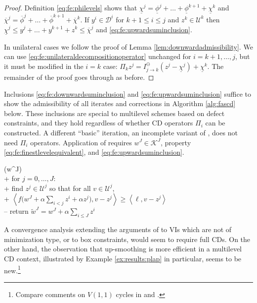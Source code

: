 \documentclass[review,hidelinks,onefignum,onetabnum]{siamart220329}
\newcommand{\ip}[2]{\left<#1,#2\right>}
\begin{document}
\begin{proof}  Definition \eqref{eq:fe:philevels} shows that $\underline{\chi}^j = \underline{\phi}^j + \dots + \underline{\phi}^{k+1} + \underline{\chi}^k$ and $\overline{\chi}^j = \overline{\phi}^j + \dots + \overline{\phi}^{k+1} + \overline{\chi}^k$.  If $y^i \in \mathcal{D}^i$ for $k+1 \le i \le j$ and $z^k \in \mathcal{U}^k$ then $\underline{\chi}^j \le y^j + \dots + y^{k+1} + z^k \le \overline{\chi}^j$ and \eqref{eq:fe:upwardsuminclusion}.

In unilateral cases we follow the proof of Lemma \ref{lem:downwardadmissibility}.  We can use \eqref{eq:fe:unilateraldecompositionoperator} unchanged for $i=k+1,\dots,j$, but it must be modified in the $i=k$ case: $\Pi_k z^j = I_{j\to k}^\ominus(z^j - \underline{\chi}^j) + \underline{\chi}^k$.  The remainder of the proof goes through as before.
\end{proof}

Inclusions \eqref{eq:fe:downwardsuminclusion} and \eqref{eq:fe:upwardsuminclusion} suffice to show the admissibility of all iterates and corrections in Algorithm \ref{alg:fascd} below.  These inclusions are special to multilevel schemes based on defect constraints, and they hold regardless of whether CD operators $\Pi_i$ can be constructed.  A different ``basic'' iteration, an incomplete variant of , does not need $\Pi_i$ operators.  Application of  requires $w^J\in\mathcal{K}^J$, property \eqref{eq:fe:finestlevelequivalent}, and \eqref{eq:fe:upwardsuminclusion}.

\begin{pseudo*}
(w^J)\text{:} \\+
    for $j = 0,\dots,J$: \\+
        \rm{find} $z^j\in \mathcal{U}^j$ \rm{so that for all} $v \in \mathcal{U}^j$, \\+
            $\displaystyle \ip{f\Big(w^J + \alpha \sum_{i<j} z^i + \alpha z^j\Big)}{v-z^j} \ge \ip{\ell}{v-z^j}$ \\--
    return $\tilde w^J=w^J + \alpha \sum_{i\le J} z^i$
\end{pseudo*}

A convergence analysis extending the arguments of \cite{GraeserKornhuber2009,Tai2003} to VIs which are not of minimization type, or to box constraints, would seem to require full CDs.  On the other hand, the observation that up-smoothing is more efficient in a multilevel CD context, illustrated by Example \ref{ex:results:plap} in particular, seems to be new.\footnote{Compare comments on $V(1,1)$ cycles in \cite{GraeserKornhuber2009} and \cite{Tai2003}.}
\end{document}
